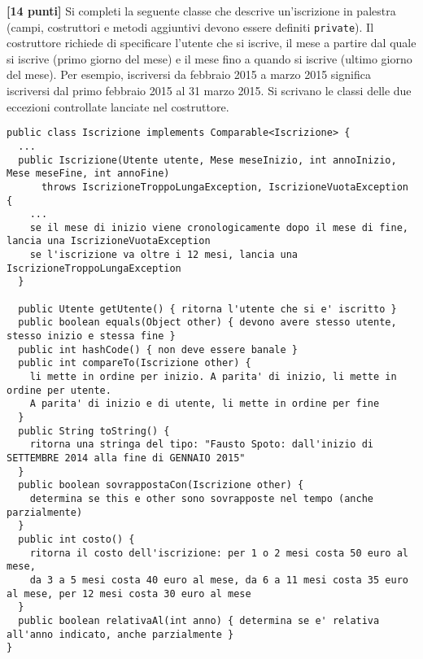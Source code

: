 \documentclass{article}[10pt]
\newcounter{esnu}
\newenvironment{esercizio}{\medskip \noindent {\bf Esercizio\addtocounter{esnu}{1} \arabic{esnu}}}{}
\begin{document}
\begin{esercizio}
\textbf{[14 punti]}
Si completi la seguente classe che descrive un'iscrizione in palestra
(campi, costruttori e metodi aggiuntivi devono essere definiti \texttt{private}).
Il costruttore richiede di specificare l'utente che si iscrive, il mese
a partire dal quale si iscrive (primo giorno del mese) e il mese fino a quando
si iscrive (ultimo giorno del mese). Per esempio, iscriversi da febbraio 2015 a marzo 2015
significa iscriversi dal primo febbraio 2015 al 31 marzo 2015. Si scrivano le classi
delle due eccezioni controllate lanciate nel costruttore.

{\small\begin{verbatim}
public class Iscrizione implements Comparable<Iscrizione> {
  ...
  public Iscrizione(Utente utente, Mese meseInizio, int annoInizio, Mese meseFine, int annoFine)
      throws IscrizioneTroppoLungaException, IscrizioneVuotaException {
    ...
    se il mese di inizio viene cronologicamente dopo il mese di fine, lancia una IscrizioneVuotaException
    se l'iscrizione va oltre i 12 mesi, lancia una IscrizioneTroppoLungaException
  }

  public Utente getUtente() { ritorna l'utente che si e' iscritto }
  public boolean equals(Object other) { devono avere stesso utente, stesso inizio e stessa fine }
  public int hashCode() { non deve essere banale }
  public int compareTo(Iscrizione other) {
    li mette in ordine per inizio. A parita' di inizio, li mette in ordine per utente.
    A parita' di inizio e di utente, li mette in ordine per fine
  }
  public String toString() {
    ritorna una stringa del tipo: "Fausto Spoto: dall'inizio di SETTEMBRE 2014 alla fine di GENNAIO 2015"
  }
  public boolean sovrappostaCon(Iscrizione other) { 
    determina se this e other sono sovrapposte nel tempo (anche parzialmente)
  }
  public int costo() {
    ritorna il costo dell'iscrizione: per 1 o 2 mesi costa 50 euro al mese,
    da 3 a 5 mesi costa 40 euro al mese, da 6 a 11 mesi costa 35 euro al mese, per 12 mesi costa 30 euro al mese
  }
  public boolean relativaAl(int anno) { determina se e' relativa all'anno indicato, anche parzialmente }
}
\end{verbatim}}

\end{esercizio}
\end{document}
